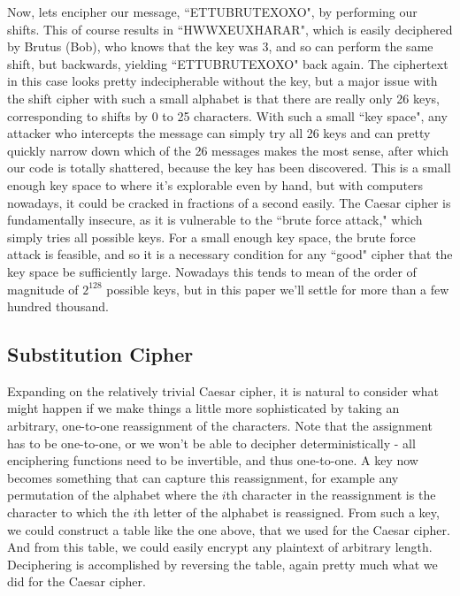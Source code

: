 \documentclass{article}
\begin{document}
\noindent Now, lets encipher our message, ``ETTUBRUTEXOXO", by performing our shifts. This of course results in ``HWWXEUXHARAR", which is easily deciphered by Brutus (Bob), who knows that the key was 3, and so can perform the same shift, but backwards, yielding ``ETTUBRUTEXOXO" back again. The ciphertext in this case looks pretty indecipherable without the key, but a major issue with the shift cipher with such a small alphabet is that there are really only 26 keys, corresponding to shifts by 0 to 25 characters. With such a small ``key space", any attacker who intercepts the message can simply try all 26 keys and can pretty quickly narrow down which of the 26 messages makes the most sense, after which our code is totally shattered, because the key has been discovered. This is a small enough key space to where it's explorable even by hand, but with computers nowadays, it could be cracked in fractions of a second easily. The Caesar cipher is fundamentally insecure, as it is vulnerable to the ``brute force attack," which simply tries all possible keys. For a small enough key space, the brute force attack is feasible, and so it is a necessary condition for any ``good" cipher that the key space be sufficiently large. Nowadays this tends to mean of the order of magnitude of $2^{128}$ possible keys, but in this paper we'll settle for more than a few hundred thousand.

\subsection{Substitution Cipher}

Expanding on the relatively trivial Caesar cipher, it is natural to consider what might happen if we make things a little more sophisticated by taking an arbitrary, one-to-one reassignment of the characters. Note that the assignment has to be one-to-one, or we won't be able to decipher deterministically - all enciphering functions need to be invertible, and thus one-to-one. A key now becomes something that can capture this reassignment, for example any permutation of the alphabet where the $i$th character in the reassignment is the character to which the $i$th letter of the alphabet is reassigned. From such a key, we could construct a table like the one above, that we used for the Caesar cipher. And from this table, we could easily encrypt any plaintext of arbitrary length. Deciphering is accomplished by reversing the table, again pretty much what we did for the Caesar cipher. \medskip
\end{document}
